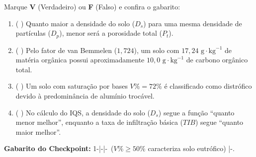 \begin{boxTeste}
Marque \textbf{V} (Verdadeiro) ou \textbf{F} (Falso) e confira o gabarito:
\begin{enumerate}[leftmargin=1.6em, itemsep=3pt]
  \item ( \quad ) Quanto maior a densidade do solo ($D_s$) para uma mesma densidade de partículas ($D_p$), menor será a porosidade total ($P_t$).
  \item ( \quad ) Pelo fator de van Bemmelen ($1{,}724$), um solo com $17{,}24\text{ g}\cdot\text{kg}^{-1}$ de matéria orgânica possui aproximadamente $10{,}0\text{ g}\cdot\text{kg}^{-1}$ de carbono orgânico total.
  \item ( \quad ) Um solo com saturação por bases $V\% = 72\%$ é classificado como distrófico devido à predominância de alumínio trocável.
  \item ( \quad ) No cálculo do IQS, a densidade do solo ($D_s$) segue a função ``quanto menor melhor'', enquanto a taxa de infiltração básica ($TIB$) segue ``quanto maior melhor''.
\end{enumerate}
\vspace{4pt}
{\footnotesize\textbf{Gabarito do Checkpoint:} 1-\V \quad|-\V \quad|-\F\ ($V\% \ge 50\%$ caracteriza solo eutrófico) \quad|-\V.}
\end{boxTeste}
